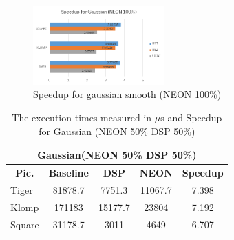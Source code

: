 \documentclass[conference]{IEEEtran}
\begin{document}
\begin{figure}[!ht]
    \centering
    \includegraphics[width=0.45\textwidth]{pic/uneon}
   \caption{Speedup for gaussian smooth (NEON 100\%)}
   \label{fig:speedupneononly}
\end{figure}


\begin{table}[!ht]
\centering
\caption{The execution times measured in  $\mu$s and Speedup for Gaussian (NEON 50\% DSP 50\%)}
\label{gauss50}
\begin{tabular}{|l|c|c|c|c|}
\hline
\multicolumn{5}{|c|}{\textbf{Gaussian(NEON 50\% DSP 50\%)}}                                                                       \\ \hline
\multicolumn{1}{|c|}{\textbf{Pic.}} & \textbf{Baseline} & \textbf{DSP} & \textbf{NEON} & \textbf{Speedup} \\ \hline
Tiger                                   & 81878.7           & 7751.3      & 11067.7        & 7.398          \\ \hline
Klomp                                   & 171183          & 15177.7      & 23804       & 7.192          \\ \hline
Square                                  & 31178.7           & 3011       & 4649        & 6.707          \\ \hline
\end{tabular}
\end{table}
\end{document}
